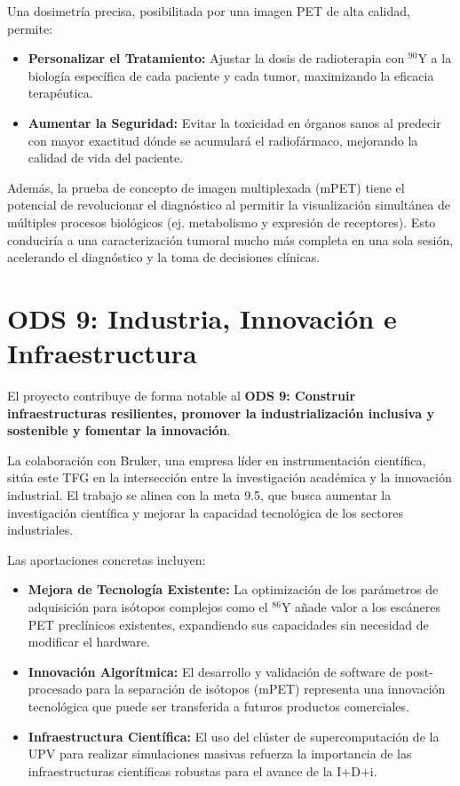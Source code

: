 Una dosimetría precisa, posibilitada por una imagen PET de alta calidad, permite:
\begin{itemize}
    \item \textbf{Personalizar el Tratamiento:} Ajustar la dosis de radioterapia con $^{90}\text{Y}$ a la biología específica de cada paciente y cada tumor, maximizando la eficacia terapéutica.
    \item \textbf{Aumentar la Seguridad:} Evitar la toxicidad en órganos sanos al predecir con mayor exactitud dónde se acumulará el radiofármaco, mejorando la calidad de vida del paciente.
\end{itemize}

Además, la prueba de concepto de imagen multiplexada (mPET) tiene el potencial de revolucionar el diagnóstico al permitir la visualización simultánea de múltiples procesos biológicos (ej. metabolismo y expresión de receptores). Esto conduciría a una caracterización tumoral mucho más completa en una sola sesión, acelerando el diagnóstico y la toma de decisiones clínicas.

\section{ODS 9: Industria, Innovación e Infraestructura}
\label{sec:ods9}

El proyecto contribuye de forma notable al \textbf{ODS 9: Construir infraestructuras resilientes, promover la industrialización inclusiva y sostenible y fomentar la innovación}.

La colaboración con Bruker, una empresa líder en instrumentación científica, sitúa este TFG en la intersección entre la investigación académica y la innovación industrial. El trabajo se alinea con la meta 9.5, que busca aumentar la investigación científica y mejorar la capacidad tecnológica de los sectores industriales.

Las aportaciones concretas incluyen:
\begin{itemize}
    \item \textbf{Mejora de Tecnología Existente:} La optimización de los parámetros de adquisición para isótopos complejos como el $^{86}\text{Y}$ añade valor a los escáneres PET preclínicos existentes, expandiendo sus capacidades sin necesidad de modificar el hardware.
    \item \textbf{Innovación Algorítmica:} El desarrollo y validación de software de post-procesado para la separación de isótopos (mPET) representa una innovación tecnológica que puede ser transferida a futuros productos comerciales.
    \item \textbf{Infraestructura Científica:} El uso del clúster de supercomputación de la UPV para realizar simulaciones masivas refuerza la importancia de las infraestructuras científicas robustas para el avance de la I+D+i.
\end{itemize}

